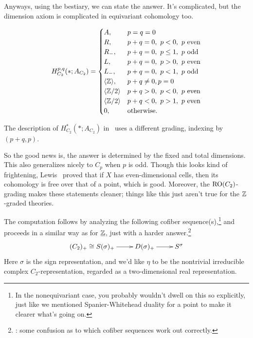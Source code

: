 Anyways, using the bestiary, we can state the answer. It's complicated, but the dimension axiom is complicated in
equivariant cohomology too.
\begin{thm}
\label{Aval}
\[H_{C_2}^{p,q}(*; A_{C_2}) = \begin{cases}
	A, &p = q = 0\\
	R, &p+q = 0,\ p < 0,\ p\text{\rm{} even}\\
	R_-, &p+q = 0,\ p \le 1,\ p\text{\rm{} odd}\\
	L, &p+q = 0,\ p > 0,\ p\text{\rm{} even}\\
	L_-, &p+q = 0,\ p < 1,\ p\text{\rm{} odd}\\
	\langle\mathbb Z\rangle, &p+q\ne 0, p = 0\\
	\langle\mathbb Z/2\rangle & p+q > 0,\ p < 0,\ p\text{\rm{} even}\\
	\langle\mathbb Z/2\rangle & p+q < 0,\ p > 1,\ p\text{\rm{} even}\\
	0, &\text{\rm otherwise.}
\end{cases}\]
\end{thm}
\begin{rem}
The description of $H_{C_2}^*(*;A_{C_2})$ in~\cite[Thm.~2.1]{Lew88} uses a different grading, indexing by
$(p+q,p)$.
\end{rem}
So the good news is, the answer is determined by the fixed and total dimensions. This also generalizes nicely to $C_p$ when
$p$ is odd. Though this looks kind of frightening, Lewis~\cite{Lew88} proved that if $X$ has even-dimensional
cells, then its cohomology is free over that of a point, which is good. Moreover, the $\mathrm{RO}(C_2)$-grading makes
these statements cleaner; things like this just aren't true for the $\mathbb Z$-graded theories.

The computation follows by analyzing the following cofiber sequence(s),\footnote{In the nonequivariant case, you
probably wouldn't dwell on this so explicitly, just like we mentioned Spanier-Whitehead
duality for a point to make it clearer what's going on.} and proceeds in a similar
way as for $\underline{\mathbb Z}$, just with a harder answer.\footnote{\TODO: some confusion as to which cofiber sequences
work out correctly.}
\begin{gather}
\label{sigmacofib}
\xymatrix{
	(C_2)_+\cong S(\sigma)_+\ar[r] & D(\sigma)_+\ar[r] & S^\sigma
}
\end{gather}
Here $\sigma$ is the sign representation, and we'd like $\eta$ to be the nontrivial irreducible complex
$C_2$-representation, regarded as a two-dimensional real representation.

